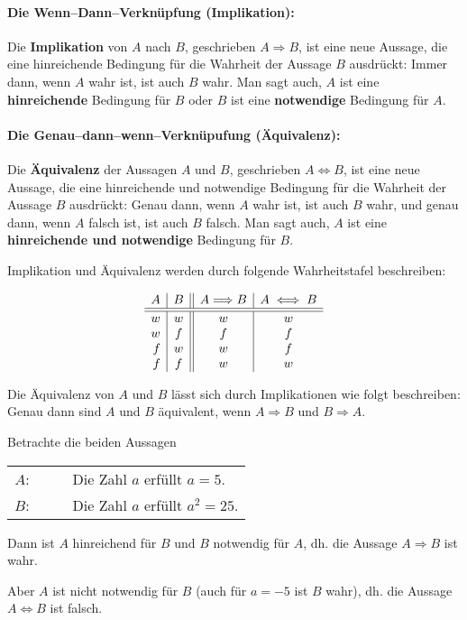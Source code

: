 \paragraph{Die Wenn--Dann--Verknüpfung (Implikation): \newline} 
Die \textbf{Implikation} von $A$ nach $B$, geschrieben $A \Longrightarrow B$, ist eine neue Aussage, die
eine hinreichende Bedingung für die Wahrheit der Aussage $B$ ausdrückt: 
Immer dann, wenn $A$ wahr ist, ist auch $B$ wahr. Man sagt auch, 
$A$ ist eine \textbf{hinreichende} Bedingung für $B$ oder $B$ ist eine \textbf{notwendige} Bedingung 
für $A$.

\paragraph{Die Genau--dann--wenn--Verknüpufung (Äquivalenz): \newline} 
Die \textbf{Äquivalenz} der Aussagen $A$ und $B$, geschrieben $A \iff B$, ist eine neue Aussage, die eine hinreichende und 
notwendige Bedingung für die Wahrheit der Aussage $B$ ausdrückt: 
Genau dann, wenn $A$ wahr ist, ist auch $B$ wahr, und genau dann, wenn 
$A$ falsch ist, ist auch $B$ falsch. Man sagt auch, 
$A$ ist eine \textbf{hinreichende und notwendige} Bedingung für $B$.

Implikation und Äquivalenz werden durch folgende Wahrheitstafel beschreiben:

	$$ \begin{array}{ r | c || c | c}
	A & B & A \Longrightarrow B & A \iff B \\
	\hline \hline
	w & w &  w & w \\
	w & f &  f & f \\
	f & w &  w & f \\
	f & f &  w & w
	\end{array} $$

Die Äquivalenz von $A$ und $B$ lässt sich durch Implikationen wie folgt beschreiben: Genau dann sind $A$ und $B$ 
äquivalent, wenn $A \Longrightarrow B$ und $B \Longrightarrow A$.

\begin{beispiel}\label{bsp4aussagen} Betrachte die beiden Aussagen

\begin{tabular}{r c l}
$A$: & $\quad$ & Die Zahl $a$ erfüllt $a = 5$. \\
$B$: & $\quad$ & Die Zahl $a$ erfüllt $a^2 = 25$.
\end{tabular}

Dann ist $A$ hinreichend für $B$ und $B$ notwendig für $A$, dh. die Aussage $A \Longrightarrow B$ ist wahr.

Aber $A$ ist nicht notwendig für $B$ (auch für $a = - 5$ ist $B$ wahr), 
dh. die Aussage $A \iff B$ ist falsch.
\end{beispiel}

